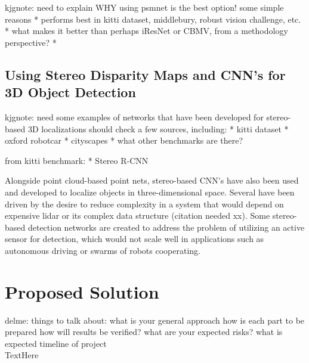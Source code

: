 kjgnote: need to explain WHY using psmnet is the best option! 
some simple reasons
* performs best in kitti dataset, middlebury, robust vision challenge, etc.
* what makes it better than perhaps iResNet or CBMV, from a methodology perspective?
* 

\subsection{Using Stereo Disparity Maps and CNN's for 3D Object Detection}
kjgnote: need some examples of networks that have been developed for stereo-based 3D localizations should check a few sources, including: 
* kitti dataset
* oxford robotcar
* cityscapes
* what other benchmarks are there?

from kitti benchmark:
* Stereo R-CNN



Alongside point cloud-based point nets, stereo-based CNN's have also been used and developed to localize objects in three-dimensional space. Several have been driven by the desire to reduce complexity in a system that would depend on expensive lidar or its complex data structure (citation needed xx). Some stereo-based detection networks are created to address the problem of utilizing an active sensor for detection, which would not scale well in applications such as autonomous driving or swarms of robots cooperating.

\section{Proposed Solution}
delme: things to talk about: 
	what is your general approach
	how is each part to be prepared
	how will results be verified?
	what are your expected risks?
	what is expected timeline of project \\
TextHere














